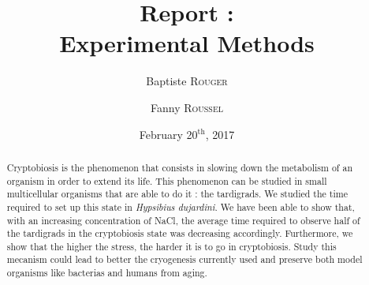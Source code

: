 \documentclass[12pt,a4paper, twocolumn]{article}
\author{Baptiste \textsc{Rouger} \and Fanny \textsc{Roussel}}
\title{Report :\\Experimental Methods}
\date{February 20$^{\text{th}}$, 2017}
\begin{document}
\maketitle

\begin{abstract}
Cryptobiosis is the phenomenon that consists in slowing down the metabolism of an organism in order to extend its life. This phenomenon can be studied in small multicellular organisms that are able to do it : the tardigrads. We studied the time required to set up this state in \textit{Hypsibius dujardini}. We have been able to show that, with an increasing concentration of NaCl, the average time required to observe half of the tardigrads in the cryptobiosis state was decreasing accordingly. Furthermore, we show that the higher the stress, the harder it is to go in cryptobiosis. Study this mecanism could lead to better the cryogenesis currently used and preserve both model organisms like bacterias and humans from aging.
\end{abstract}

\end{document}
